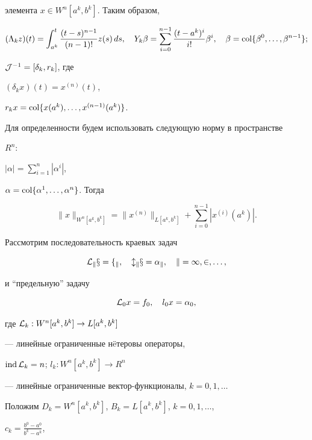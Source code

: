 элемента $x\in W^n[a^k,b^k]$. Таким образом,


$$


(\Lambda_kz)(t) = \int_{a^k}^t\frac{(t-s)^{n-1}}{(n-1)!} z(s)\,ds,\quad


Y_k\beta = \sum_{i=0}^{n-1} \frac{(t-a^k)^i}{i!} \beta^i,\quad


\beta=\col \{\beta^0,\dotsc,\beta^{n-1}\};


$$


${\cal J}^{-1}=[\delta_k,r_k]$, где


$(\delta_k x)(t) = x^{(n)}(t)$,


$r_k x = \operatorname{col}\{x(a^k),\dotsc,x^{(n-1)}(a^k)\}$.


Для определенности будем использовать следующую норму в пространстве


$R^n$:


$|\alpha|=\sum\limits_{i=1}^n|\alpha^i|$,


$\alpha = \operatorname{col}\{\alpha^1,\dotsc,\alpha^n\}$. Тогда


$$


\|x\|_{W^n[a^k,b^k]}=


\|x^{(n)}\|_{L[a^k,b^k]}+\sum_{i=0}^{n-1} |x^{(i)}(a^k)|.


$$





Рассмотрим последовательность краевых задач


\begin{equation}


\lkxfk,\quad \lkxak,\quad \kodi,


\end{equation}


и ``предельную'' задачу


$$


{\cal L}_0 x=f_0,\quad l_0x=\alpha_0,


$$


где ${\cal L}_k:W^n[a^k,b^k]\to L[a^k,b^k]$


--- линейные ограниченные н\"eтеровы операторы,


$\operatorname{ind} {\cal L}_k=n$; $l_k:W^n[a^k,b^k]\to R^n$


--- линейные ограниченные вектор-функционалы, $k=0,1,\dotsc$





Положим $D_k=W^n[a^k,b^k]$, $B_k=L[a^k,b^k]$, $k=0,1,\dotsc$,


$c_k=\frac{b^0-a^0}{b^k-a^k}$,



